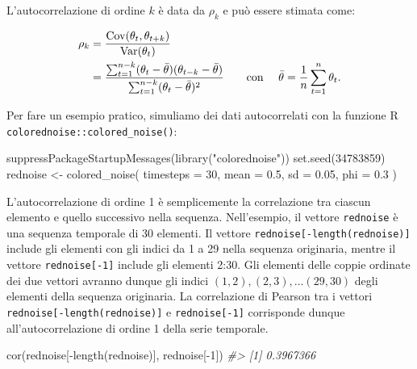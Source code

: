 \documentclass[
]{memoir}
\newenvironment{Shaded}{\begin{snugshade}}{\end{snugshade}}
\newcommand{\AttributeTok}[1]{\textcolor[rgb]{0.77,0.63,0.00}{#1}}
\newcommand{\CommentTok}[1]{\textcolor[rgb]{0.56,0.35,0.01}{\textit{#1}}}
\newcommand{\DecValTok}[1]{\textcolor[rgb]{0.00,0.00,0.81}{#1}}
\newcommand{\FloatTok}[1]{\textcolor[rgb]{0.00,0.00,0.81}{#1}}
\newcommand{\FunctionTok}[1]{\textcolor[rgb]{0.00,0.00,0.00}{#1}}
\newcommand{\NormalTok}[1]{#1}
\newcommand{\OtherTok}[1]{\textcolor[rgb]{0.56,0.35,0.01}{#1}}
\newcommand{\SpecialCharTok}[1]{\textcolor[rgb]{0.00,0.00,0.00}{#1}}
\newcommand{\StringTok}[1]{\textcolor[rgb]{0.31,0.60,0.02}{#1}}
\DeclareMathOperator{\Var}{Var} %
\DeclareMathOperator{\Cov}{Cov} %
\begin{document}
L'autocorrelazione di ordine \(k\) è data da \(\rho_k\) e può essere stimata come:

\begin{align}
\rho_k &= \frac{\Cov(\theta_t, \theta_{t+k})}{\Var(\theta_t)}\notag\\
&= \frac{\sum_{t=1}^{n-k}(\theta_t - \bar{\theta})(\theta_{t-k} - \bar{\theta})}{\sum_{t=1}^{n-k}(\theta_t - \bar{\theta})^2} \qquad\text{con }\quad \bar{\theta} = \frac{1}{n}\sum_{t=1}^{n}\theta_t.
\label{eq:autocor}
\end{align}

Per fare un esempio pratico, simuliamo dei dati autocorrelati con la funzione R \texttt{colorednoise::colored\_noise()}:

\begin{Shaded}
\begin{Highlighting}[]
\FunctionTok{suppressPackageStartupMessages}\NormalTok{(}\FunctionTok{library}\NormalTok{(}\StringTok{"colorednoise"}\NormalTok{))}
\FunctionTok{set.seed}\NormalTok{(}\DecValTok{34783859}\NormalTok{)}
\NormalTok{rednoise }\OtherTok{\textless{}{-}} \FunctionTok{colored\_noise}\NormalTok{(}
  \AttributeTok{timesteps =} \DecValTok{30}\NormalTok{, }\AttributeTok{mean =} \FloatTok{0.5}\NormalTok{, }\AttributeTok{sd =} \FloatTok{0.05}\NormalTok{, }\AttributeTok{phi =} \FloatTok{0.3}
\NormalTok{)}
\end{Highlighting}
\end{Shaded}

L'autocorrelazione di ordine 1 è semplicemente la correlazione tra ciascun elemento e quello successivo nella sequenza. Nell'esempio, il vettore \texttt{rednoise} è una sequenza temporale di 30 elementi. Il vettore \texttt{rednoise{[}-length(rednoise){]}} include gli elementi con gli indici da 1 a 29 nella sequenza originaria, mentre il vettore \texttt{rednoise{[}-1{]}} include gli elementi 2:30. Gli elementi delle coppie ordinate dei due vettori avranno dunque gli indici \((1, 2), (2, 3), \dots (29, 30)\) degli elementi della sequenza originaria. La correlazione di Pearson tra i vettori \texttt{rednoise{[}-length(rednoise){]}} e \texttt{rednoise{[}-1{]}} corrisponde dunque all'autocorrelazione di ordine 1 della serie temporale.

\begin{Shaded}
\begin{Highlighting}[]
\FunctionTok{cor}\NormalTok{(rednoise[}\SpecialCharTok{{-}}\FunctionTok{length}\NormalTok{(rednoise)], rednoise[}\SpecialCharTok{{-}}\DecValTok{1}\NormalTok{])}
\CommentTok{\#\textgreater{} [1] 0.3967366}
\end{Highlighting}
\end{Shaded}
\end{document}
